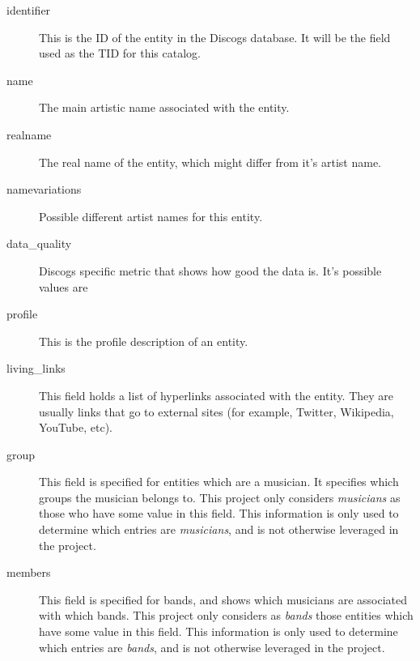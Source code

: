 \documentclass[epsfig,a4paper,11pt,titlepage,twoside,openany]{book}
\begin{document}
\begin{description}
\item[identifier] This is the ID of the entity in the Discogs database. It will be the field used as the TID for this catalog.

\item[name] The main artistic name associated with the entity.

\item[realname] The real name of the entity, which might differ from it's artist name.

\item[namevariations] Possible different artist names for this entity.

\item[data\_quality] Discogs specific metric that shows how good the data is. It's possible values are 

\item[profile] This is the profile description of an entity.

\item[living\_links] This field holds a list of hyperlinks associated with the entity. They are usually links that go to external sites (for example, Twitter, Wikipedia, YouTube, etc).

\item[group] This field is specified for entities which are a musician. It specifies which groups the musician belongs to. This project only considers \textit{musicians} as those who have some value in this field. This information is only used to determine which entries are \textit{musicians}, and is not otherwise leveraged in the project. 

\item[members] This field is specified for bands, and shows which musicians are associated with which bands. This project  only considers as \textit{bands} those entities which have some value in this field. This information is only used to determine which entries are \textit{bands}, and is not otherwise leveraged in the project.

\end{description}
\end{document}
